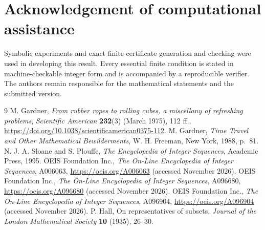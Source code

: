 \documentclass[9pt]{extarticle}
\begin{document}
\appendix


\section*{Acknowledgement of computational assistance}
Symbolic experiments and exact finite-certificate generation and checking were used in developing this result. Every essential finite condition is stated in machine-checkable integer form and is accompanied by a reproducible verifier. The authors remain responsible for the mathematical statements and the submitted version.

\begin{thebibliography}{9}
 M. Gardner, \emph{From rubber ropes to rolling cubes, a miscellany of refreshing problems}, \emph{Scientific American} \textbf{232}(3) (March 1975), 112 ff., \url{https://doi.org/10.1038/scientificamerican0375-112}.
 M. Gardner, \emph{Time Travel and Other Mathematical Bewilderments}, W. H. Freeman, New York, 1988, p.~81.
 N. J. A. Sloane and S. Plouffe, \emph{The Encyclopedia of Integer Sequences}, Academic Press, 1995.
 OEIS Foundation Inc., \emph{The On-Line Encyclopedia of Integer Sequences}, A006063, \url{https://oeis.org/A006063} (accessed November 2026).
 OEIS Foundation Inc., \emph{The On-Line Encyclopedia of Integer Sequences}, A096680, \url{https://oeis.org/A096680} (accessed November 2026).
 OEIS Foundation Inc., \emph{The On-Line Encyclopedia of Integer Sequences}, A096904, \url{https://oeis.org/A096904} (accessed November 2026).
 P. Hall, On representatives of subsets, \emph{Journal of the London Mathematical Society} \textbf{10} (1935), 26--30.
\end{thebibliography}
\end{document}
